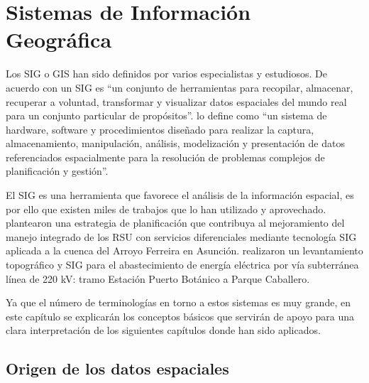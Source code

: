 \chapter{Sistemas de Información Geográfica}
\label{chap3}
\ifpdf
    \graphicspath{{Chapter3/Chapter3Figs/PNG/}{Chapter3/Chapter3Figs/PDF/}{Chapter3/Chapter3Figs/}}
\else
    \graphicspath{{Chapter3/Chapter3Figs/EPS/}{Chapter3/Chapter3Figs/}}
\fi


Los SIG o GIS han sido definidos por varios especialistas y estudiosos. De acuerdo con \citet{Burrough1986PrinciplesAssessment} un SIG es “un conjunto de herramientas para recopilar, almacenar, recuperar a voluntad, transformar y visualizar datos espaciales del mundo real para un conjunto particular de propósitos”. \citet{NCGIA1990IntroductionGIS} lo define como “un sistema de hardware, software y procedimientos diseñado para realizar la captura, almacenamiento, manipulación, análisis, modelización y presentación de datos referenciados espacialmente para la resolución de problemas complejos de planificación y gestión”.

El SIG es una herramienta que favorece el análisis de la información espacial, es por ello que existen miles de trabajos que lo han utilizado y aprovechado. \citet{Cabral2018EstrategiasAsuncion} plantearon una estrategia de planificación que contribuya al mejoramiento del manejo integrado de los RSU con servicios diferenciales mediante tecnología SIG aplicada a la cuenca del Arroyo Ferreira en Asunción. \citet{Acosta2006LevantamientoCaballero} realizaron un levantamiento topográfico y SIG para el abastecimiento de energía eléctrica por vía subterránea línea de 220 kV: tramo Estación Puerto Botánico a Parque Caballero.


Ya que el número de terminologías en torno a estos sistemas es muy grande, en este capítulo se explicarán los conceptos básicos que servirán de apoyo para una clara interpretación de los siguientes capítulos donde han sido aplicados.

\section{Origen de los datos espaciales}

